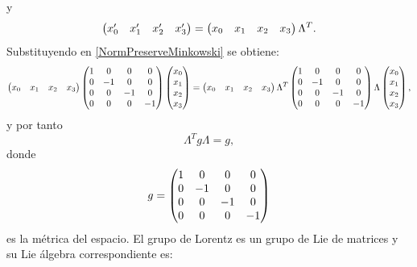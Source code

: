 \documentclass{article}
\theoremstyle{plain}
\theoremstyle{definition}
\begin{document}
	y
	\[
	\left(\begin{array}{@{}cccc@{}}
	x^\prime_0&x^\prime_1&x^\prime_2&x^\prime_3\\
	\end{array} \right) =
	\left(\begin{array}{@{}cccc@{}}
	x_0&x_1&x_2&x_3\\
	\end{array} \right) \Lambda^T \text{.}
	\] 
	Substituyendo en \eqref{NormPreserveMinkowski} se obtiene:
	\begin{dmath}
		\left(\begin{array}{@{}cccc@{}}
			x_0&x_1&x_2&x_3\\
		\end{array} \right)
		\left(\begin{array}{@{}cccc@{}}
			1 & 0 &0&0 \\
			0 & -1 &0&0 \\
			0 & 0 &-1&0 \\
			0 & 0 &0&-1 \\
		\end{array} \right)
		\left(\begin{array}{@{}c@{}}
			x_0\\x_1\\x_2\\x_3\\
		\end{array} \right)
		=
		\left(\begin{array}{@{}cccc@{}}
			x_0&x_1&x_2&x_3\\
		\end{array} \right)\Lambda^T
		\left(\begin{array}{@{}cccc@{}}
			1 & 0 &0&0 \\
			0 & -1 &0&0 \\
			0 & 0 &-1&0 \\
			0 & 0 &0&-1 \\
		\end{array} \right)
		\Lambda \left(\begin{array}{@{}c@{}}
			x_0\\x_1\\x_2\\x_3\\
		\end{array} \right) ,
	\end{dmath}
	y por tanto \[\Lambda^Tg\Lambda=g,\]
	donde \[g=\left(\begin{array}{@{}cccc@{}}
	1 & 0 &0&0 \\
	0 & -1 &0&0 \\
	0 & 0 &-1&0 \\
	0 & 0 &0&-1 \\
	\end{array} \right)\] es la métrica del espacio. El grupo de Lorentz es un grupo de Lie de matrices y su Lie álgebra correspondiente es: 
\end{document}
